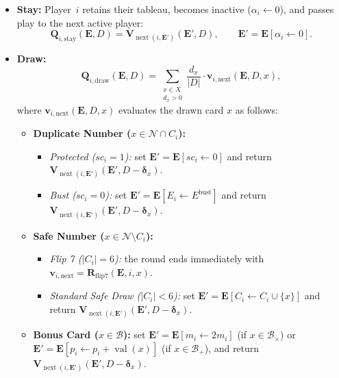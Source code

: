 \documentclass{article}
\theoremstyle{plain}
\theoremstyle{definition}
\theoremstyle{remark}
\DeclareMathOperator{\val}{val}
\DeclareMathOperator{\nextplayer}{next}
\begin{document}
\begin{itemize}
    \item \textbf{Stay:} Player~$i$ retains their tableau, becomes inactive ($\alpha_i \leftarrow 0$), and passes play to the next active player:
    \[
        \mathbf{Q}_{i,\text{stay}}(\mathbf{E}, D) = \mathbf{V}_{\nextplayer(i, \mathbf{E}')}(\mathbf{E}', D), \qquad \mathbf{E}' = \mathbf{E}[\alpha_i \leftarrow 0].
    \]
    \item \textbf{Draw:}
    \[
        \mathbf{Q}_{i,\text{draw}}(\mathbf{E}, D) = \sum_{\substack{x \in X \\ d_x > 0}} \frac{d_x}{|D|} \cdot \mathbf{v}_{i,\text{next}}(\mathbf{E}, D, x),
    \]
    where $\mathbf{v}_{i,\text{next}}(\mathbf{E}, D, x)$ evaluates the drawn card $x$ as follows:
    \begin{itemize}
        \item \textbf{Duplicate Number ($x \in \mathcal{N} \cap C_i$):}
        \begin{itemize}
            \item \textit{Protected ($sc_i = 1$):} set $\mathbf{E}' = \mathbf{E}[sc_i \leftarrow 0]$ and return $\mathbf{V}_{\nextplayer(i, \mathbf{E}')}(\mathbf{E}', D - \boldsymbol{\delta}_x)$.
            \item \textit{Bust ($sc_i = 0$):} set $\mathbf{E}' = \mathbf{E}[E_i \leftarrow E^{\text{bust}}]$ and return $\mathbf{V}_{\nextplayer(i, \mathbf{E}')}(\mathbf{E}', D - \boldsymbol{\delta}_x)$.
        \end{itemize}

        \item \textbf{Safe Number ($x \in \mathcal{N} \setminus C_i$):}
        \begin{itemize}
            \item \textit{Flip 7 ($|C_i| = 6$):} the round ends immediately with $\mathbf{v}_{i,\text{next}} = \mathbf{R}_{\text{flip7}}(\mathbf{E}, i, x)$.
            \item \textit{Standard Safe Draw ($|C_i| < 6$):} set $\mathbf{E}' = \mathbf{E}[C_i \leftarrow C_i \cup \{x\}]$ and return $\mathbf{V}_{\nextplayer(i, \mathbf{E}')}(\mathbf{E}', D - \boldsymbol{\delta}_x)$.
        \end{itemize}

        \item \textbf{Bonus Card ($x \in \mathcal{B}$):} set $\mathbf{E}' = \mathbf{E}[m_i \leftarrow 2m_i]$ (if $x \in \mathcal{B}_{\times}$) or $\mathbf{E}' = \mathbf{E}[p_i \leftarrow p_i + \val(x)]$ (if $x \in \mathcal{B}_{+}$), and return $\mathbf{V}_{\nextplayer(i, \mathbf{E}')}(\mathbf{E}', D - \boldsymbol{\delta}_x)$.


\end{itemize}
\end{itemize}
\end{document}
